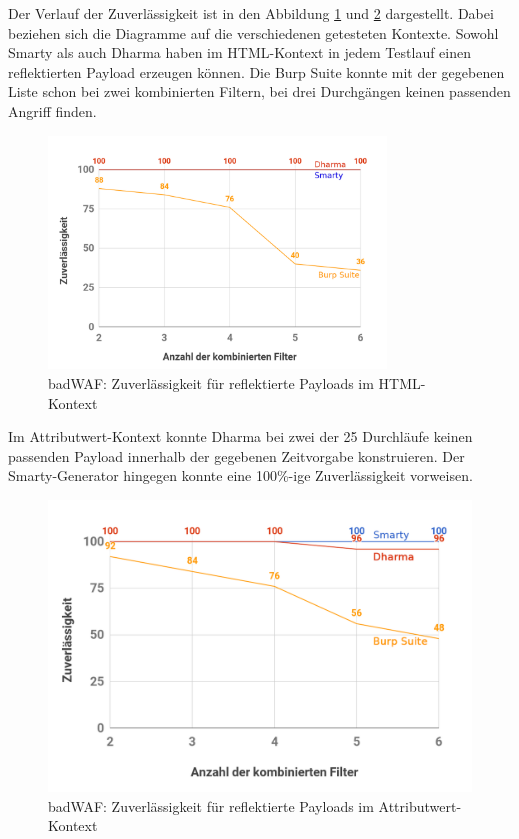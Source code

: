 Der Verlauf der Zuverlässigkeit ist in den Abbildung \ref{fig:BadWAFDiagramReflectedFilterHTMLCombined} und \ref{fig:BadWAFDiagramReflectedFilterAttrValCombined} dargestellt. Dabei beziehen sich die Diagramme auf die verschiedenen getesteten Kontexte.
Sowohl Smarty als auch Dharma haben im HTML-Kontext in jedem Testlauf einen reflektierten Payload erzeugen können. Die Burp Suite konnte mit der gegebenen Liste schon bei zwei kombinierten Filtern, bei drei Durchgängen keinen passenden Angriff finden.

\begin{figure}[htbp] 
	\centering
	\includegraphics[width=0.8\textwidth]{contents/images/BadWAFDiagramReflectedFilterHTMLCombined}
	\caption{badWAF: Zuverlässigkeit für reflektierte Payloads im HTML-Kontext}
	\label{fig:BadWAFDiagramReflectedFilterHTMLCombined}
\end{figure}

Im Attributwert-Kontext konnte Dharma bei zwei der 25 Durchläufe keinen passenden Payload innerhalb der gegebenen Zeitvorgabe konstruieren. Der Smarty-Generator hingegen konnte eine 100\%-ige Zuverlässigkeit vorweisen.

\begin{figure}[htbp] 
	\centering
	\includegraphics[width=.8\textwidth]{contents/images/BadWAFDiagramReflectedFilterAttrValCombined}
	\caption{badWAF: Zuverlässigkeit für reflektierte Payloads im Attributwert-Kontext}
	\label{fig:BadWAFDiagramReflectedFilterAttrValCombined}
\end{figure}

